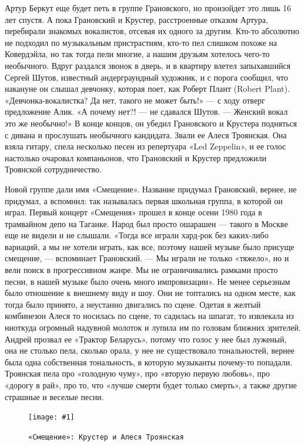 \documentclass[10pt, twoside]{book}
\newcommand{\myincludegraphics}[1]{\texttt{[image: \#1]}}
\begin{document}
Артур Беркут еще будет петь в группе Грановского, но произойдет это лишь 16 лет спустя. А пока Грановский и Крустер,
расстроенные отказом Артура, перебирали знакомых вокалистов, отсевая их одного за другим. Кто-то абсолютно не подходил
по музыкальным пристрастиям, кто-то пел слишком похоже на Ковердэйла, но так тогда пели многие, а нашим друзьям хотелось
чего-то необычного. Вдруг раздался звонок в дверь, и в квартиру влетел запыхавшийся Сергей Шутов, известный
андерграундный художник, и с порога сообщил, что накануне он слышал девчонку, которая поет, как Роберт Плант (Robert
Plant). «Девчонка-вокалистка? Да нет, такого не может быть!» — с ходу отверг предложение Алик. «А почему нет?! — не
сдавался Шутов. — Женский вокал это же необычно!» В конце концов, он убедил Грановского и Крустера подняться с дивана и
прослушать необычного кандидата. Звали ее Алеся Троянская. Она взяла гитару, спела несколько песен из репертуара «Led
Zeppelin», и ее голос настолько очаровал компаньонов, что Грановский и Крустер предложили Троянской сотрудничество.

Новой группе дали имя «Смещение». Название придумал Грановский, вернее, не придумал, а вспомнил: так называлась первая
школьная группа, в которой он играл. Первый концерт «Смещения» прошел в конце осени 1980 года в трамвайном депо на
Таганке. Народ был просто ошарашен — такого в Москве еще не видели и не слышали. «Тогда все играли хард-рок без
каких-либо вариаций, а мы не хотели играть, как все, поэтому нашей музыке было присуще смещение, — вспоминает
Грановский. — Мы играли не только «тяжело», но и вели поиск в прогрессивном жанре. Мы не ограничивались рамками просто
песни, в нашей музыке было очень много импровизации». Не менее серьезным было отношение к внешнему виду и шоу. Они не
топтались на одном месте, как тогда было принято, а неустанно двигались по сцене. Одетая в желтый комбинезон Алеся то
носилась по сцене, то садилась на шпагат, то извлекала из ниоткуда огромный надувной молоток и лупила им по головам
ближних зрителей. Андрей прозвал ее «Трактор Беларусь», потому что голос у нее был луженый, она не столько пела, сколько
орала, у нее не существовало тональностей, вернее была одна собственная тональность, в которую музыканты почему-то
попадали. Троянская пела про «голодную чуму», про «вторую первую любовь», про «дорогу в рай», про то, что «лучше смерти
будет только смерть», а также другие страшные и веселые песни.

\begin{figure}
    \centering
    \myincludegraphics{Image08}
    \caption{\texttt{«Смещение»: Крустер и Алеся Троянская}}
\end{figure}
\end{document}
